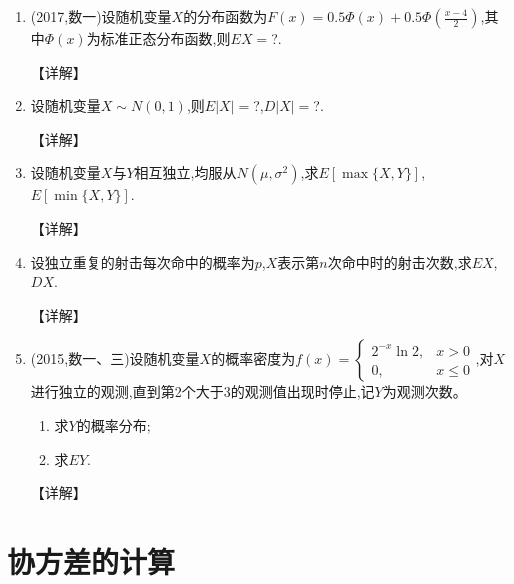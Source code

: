 \documentclass[12pt, a4paper, oneside, UTF8]{ctexbook}
\begin{document}
\begin{enumerate}[label=\arabic*.]
    \item (2017,数一)设随机变量$X$的分布函数为$F(x)=0.5\Phi(x)+0.5\Phi\left(\frac{x-4}{2}\right)$,其中$\Phi(x)$为标准正态分布函数,则$EX=$?.
    
    \begin{solution}
    【详解】
    \end{solution}
    
    \item 设随机变量$X\sim N(0,1)$,则$E|X|=$?,$D|X|=$?.
    
    \begin{solution}
    【详解】
    \end{solution}
    
    \item 设随机变量$X$与$Y$相互独立,均服从$N(\mu,\sigma^2)$,求$E[\max\{X,Y\}]$,$E[\min\{X,Y\}]$.
    
    \begin{solution}
    【详解】
    \end{solution}
    
    \item 设独立重复的射击每次命中的概率为$p$,$X$表示第$n$次命中时的射击次数,求$EX$,$DX$.
    
    \begin{solution}
    【详解】
    \end{solution}
    
    \item  (2015,数一、三)设随机变量$X$的概率密度为$f(x)=\begin{cases}2^{-x}\ln2, & x>0 \\ 0, & x\leq0\end{cases}$,对$X$进行独立的观测,直到第2个大于3的观测值出现时停止,记$Y$为观测次数。
    \begin{enumerate}
        \item 求$Y$的概率分布;
        \item 求$EY$.
    \end{enumerate}
    
    \begin{solution}
    【详解】
    \end{solution}
\end{enumerate}

\section{协方差的计算}
\end{document}
